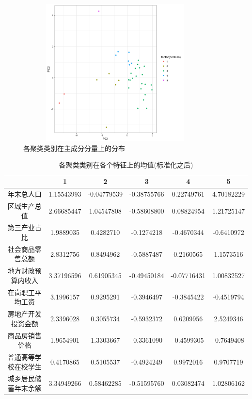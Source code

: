 \documentclass [a4paper]{article}
\begin{document}
\begin{figure}[h!]
  \centering
         \includegraphics[width=10cm,height=7.5cm]{img/hccluster.png}
      \caption{各聚类类别在主成分分量上的分布}
\end{figure}

\begin{table}[h]
  \centering
  \caption{各聚类类别在各个特征上的均值(标准化之后)}
  \small %
  \begin{tabular}{cccccc}
  \toprule
  &1&2&3&4&5\\
  \midrule
年末总人口	 & 1.15543993 & 	-0.04779539	 & -0.38755766	 & 0.22749761	 & 4.70182229\\
区域生产总值 & 	2.66685447 & 	1.04547808 & 	-0.58608800	 & 0.08824954	 & 1.21725147\\
第三产业占比 & 	1.9889035	 & 0.4282710	 & -0.1274218 & 	-0.4670344 & 	-0.6410972\\
社会商品零售总额 & 	2.8312756 & 	0.8494962	 & -0.5887487 & 	0.2160565 & 	1.1573516\\
地方财政预算内收入	 & 3.37196596 & 	0.61905345 & 	-0.49450184	 & -0.07716431 & 	1.00832527\\
在岗职工平均工资 & 	3.1996157	 & 0.9295291 & 	-0.3946497 & 	-0.3845422 & 	-0.4519794\\
房地产开发投资金额	 & 2.3396028 & 	0.3055734 & 	-0.5932372	 & 0.6209956	 & 2.5249346\\
商品房销售价格 & 	1.9654901	 & 1.3303667 & 	-0.3361090 & 	-0.4599305 & 	-0.7649408\\
普通高等学校在校学生 & 	0.4170865 & 	0.5105537	 & -0.4924249	 & 0.9972016	 & 0.9707719\\
城乡居民储蓄年末余额 & 	3.34949266	 & 0.58462285	 & -0.51595760 & 	0.03082474 & 	1.02806162\\
  \bottomrule
  \end{tabular}
\end{table}
\end{document}
